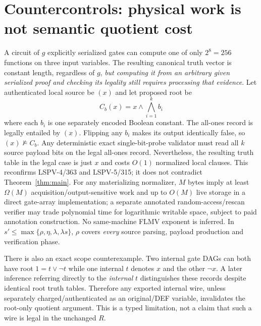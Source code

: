 \documentclass[11pt]{article}
\begin{document}
\section*{Countercontrols: physical work is not semantic quotient cost}
A circuit of $g$ explicitly serialized gates can compute one of only $2^8=256$ functions on three input variables. The resulting canonical truth vector is constant length, regardless of $g$, \emph{but computing it from an arbitrary given serialized proof and checking its legality still requires processing that evidence}. Let authenticated local source be $(x)$ and let proposed root be
\[
C_b(x)=x\wedge\bigwedge_{i=1}^{k}b_i
\]
where each $b_i$ is one separately encoded Boolean constant. The all-ones record is legally entailed by $(x)$. Flipping any $b_i$ makes its output identically false, so $(x)\not\models C_b$. Any deterministic exact single-bit-probe validator must read all $k$ source payload bits on the legal all-ones record. Nevertheless, the resulting truth table in the legal case is just $x$ and costs $O(1)$ normalized local clauses. This reconfirms LSPV-4/363 and LSPV-5/315; it does not contradict Theorem~\ref{thm:main}. For any materializing normalizer, $M$ bytes imply at least $\Omega(M)$ acquisition/output-sensitive work and up to $O(M)$ live storage in a direct gate-array implementation; a separate annotated random-access/rescan verifier may trade polynomial time for logarithmic writable space, subject to paid annotation construction. No same-machine FLMV exponent is inferred. In $s'\le\max\{\rho,\eta,\lambda,\lambda s\}$, $\rho$ covers \emph{every} source parsing, payload production and verification phase.

There is also an exact scope counterexample. Two internal gate DAGs can both have root $1=t\vee\neg t$ while one internal $t$ denotes $x$ and the other $\neg x$. A later inference referring directly to the \emph{internal} $t$ distinguishes these records despite identical root truth tables. Therefore any exported internal wire, unless separately charged/authenticated as an original/DEF variable, invalidates the root-only quotient argument. This is a typed limitation, not a claim that such a wire is legal in the unchanged $R$.
\end{document}
